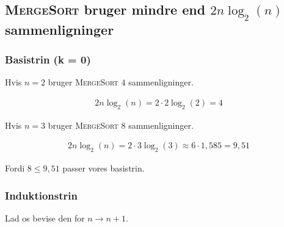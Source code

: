 \subsection{\textsc{MergeSort} bruger mindre end \(2n\log_2(n)\) sammenligninger}
\label{subsec:merge-sort-bruger-mindre-end-sammenligninger}

\subsubsection{Basistrin (k = 0)}

Hvis \(n = 2\) bruger \textsc{MergeSort} \(4\) sammenligninger.

\begin{equation}
    \begin{aligned}
        2n\log_2(n) = 2 \cdot 2\log_2(2) = 4
    \end{aligned}
    \label{eq:equation20}
\end{equation}

Hvis \(n = 3\) bruger \textsc{MergeSort} \(8\) sammenligninger.

\begin{equation}
    \begin{aligned}
        2n\log_2(n) = 2 \cdot 3\log_2(3) \approx 6 \cdot 1,585 = 9,51
    \end{aligned}
    \label{eq:equation21}
\end{equation}

Fordi \(8 \leq 9,51\) passer vores basistrin.

\subsubsection{Induktionstrin}

Lad os bevise den for \(n \rightarrow n + 1\).

